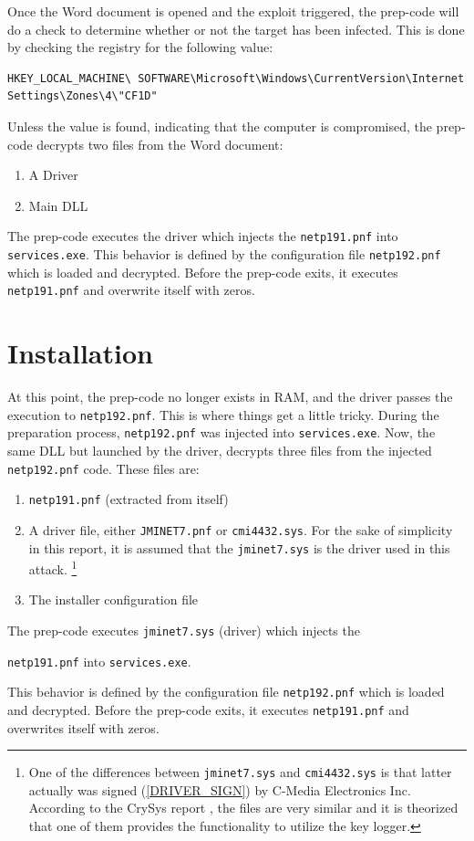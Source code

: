 \documentclass[11pt,english,a4paper]{report}
\begin{document}
Once the Word document is opened and the exploit triggered, the prep-code will do a check to determine whether or not the target has been infected. This is done by checking the registry for the following value:
\begin{lstlisting}
HKEY_LOCAL_MACHINE\ SOFTWARE\Microsoft\Windows\CurrentVersion\Internet Settings\Zones\4\"CF1D" 
\end{lstlisting}
Unless the value is found, indicating that the computer is compromised, the prep-code decrypts two files from the Word document:
 \begin{enumerate}
   \item  A Driver
   \item  Main DLL
  \end{enumerate}
{\raggedright
The prep-code executes the driver which injects the \texttt{netp191.pnf} into \texttt{services.exe}. This behavior is defined by the configuration file \texttt{netp192.pnf} which is loaded and decrypted. Before the prep-code exits, it executes \texttt{netp191.pnf} and overwrite itself with zeros. 
\par}

\section{Installation}
At this point, the prep-code no longer exists in RAM, and the driver passes the execution to \texttt{netp192.pnf}. This is where things get a little tricky. During the preparation process, \texttt{netp192.pnf} was injected into \texttt{services.exe}. Now, the same DLL but launched by the driver, decrypts three files from the injected \texttt{netp192.pnf} code. These files are:
 \begin{enumerate}
   \item \texttt{netp191.pnf} (extracted from itself)
   \item A driver file, either \texttt{JMINET7.pnf} or \texttt{cmi4432.sys}. For the sake of simplicity in this report, it is assumed that the \texttt{jminet7.sys} is the driver used in this attack. \footnote{One of the differences between \texttt{jminet7.sys} and \texttt{cmi4432.sys} is that latter actually was signed (\ref{DRIVER_SIGN}) by C-Media Electronics Inc. According to the CrySys report \cite{DUQU_BUD}, the files are very similar and it is theorized that one of them provides the functionality to utilize the key logger.}
   \item The installer configuration file
  \end{enumerate}
The prep-code executes \texttt{jminet7.sys} (driver) which injects the {\raggedright \texttt{netp191.pnf} into \texttt{services.exe}. \par} This behavior is defined by the configuration file \texttt{netp192.pnf} which is loaded and decrypted. Before the prep-code exits, it executes \texttt{netp191.pnf} and overwrites itself with zeros. 
\end{document}
